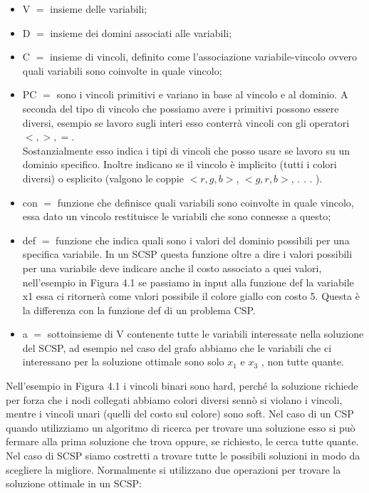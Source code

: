\begin{itemize}
    \item V $=$ insieme delle variabili;
    \item D $=$ insieme dei domini associati alle variabili;
    \item C $=$ insieme di vincoli, definito come l'associazione
          variabile-vincolo ovvero quali variabili sono coinvolte in quale vincolo;
    \item PC $=$ sono i vincoli primitivi e variano in base al vincolo e al
          dominio. A seconda del tipo di vincolo che possiamo avere i primitivi
          possono essere diversi, esempio se lavoro sugli interi esso conterrà
          vincoli con gli operatori $<,>,=$. \\Sostanzialmente esso indica i
          tipi di vincoli che posso usare se lavoro su un dominio specifico.
          Inoltre indicano se il vincolo è implicito (tutti i colori diversi) o
          esplicito (valgono le coppie $<r,g,b>$, $<g,r,b>$, . . . ).
    \item con $=$ funzione che definisce quali variabili sono coinvolte in quale
          vincolo, essa dato un vincolo restituisce le variabili che sono connesse a
          questo;
    \item def $=$ funzione che indica quali sono i valori del dominio possibili
          per una specifica variabile. In un SCSP questa funzione oltre a dire i
          valori possibili per una variabile deve indicare anche il costo associato a
          quei valori, nell'esempio in Figura 4.1 se passiamo in input alla funzione
          def la variabile x1 essa ci ritornerà come valori possibile il colore giallo
          con costo 5. Questa è la differenza con la funzione def di un problema CSP.
    \item a $=$ sottoinsieme di V contenente tutte le variabili interessate
          nella soluzione del SCSP, ad esempio nel caso del grafo abbiamo che le
          variabili che ci interessano per la soluzione ottimale sono solo $x_1$ e
          $x_3$ , non tutte quante.
\end{itemize}
Nell'esempio in Figura 4.1 i vincoli binari sono hard, perché la soluzione
richiede per forza che i nodi collegati abbiamo colori diversi sennò si violano
i vincoli, mentre i vincoli unari (quelli del costo sul colore) sono soft. Nel
caso di un CSP quando utilizziamo un algoritmo di ricerca per trovare una
soluzione esso si può fermare alla prima soluzione che trova oppure, se
richiesto, le cerca tutte quante. Nel caso di SCSP siamo costretti a trovare
tutte le possibili soluzioni in modo da scegliere la migliore. Normalmente si
utilizzano due operazioni per trovare la soluzione ottimale in un SCSP:

